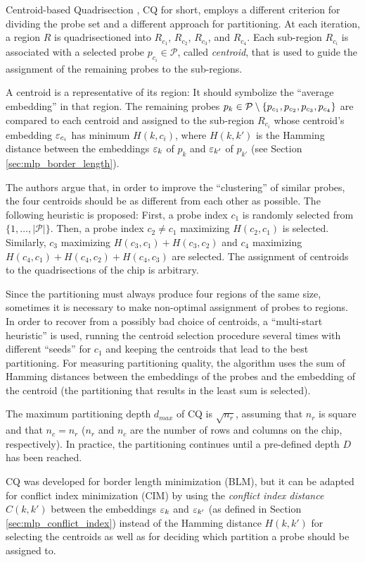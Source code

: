 Centroid-based Quadrisection \citep{Kahng2003a}, CQ for short, employs a
different criterion for dividing the probe set and a different approach for
partitioning. At each iteration, a region $R$ is quadrisectioned into $R_{c_1}$,
$R_{c_2}$, $R_{c_3}$, and $R_{c_4}$. Each sub-region $R_{c_i}$ is associated
with a selected probe $p_{c_i}\in \mathcal{P}$, called \emph{centroid}, that is
used to guide the assignment of the remaining probes to the sub-regions.

A centroid is a representative of its region: It should symbolize the ``average
embedding'' in that region. The remaining probes
$p_k \in {\mathcal{P}} \setminus \{p_{c_1},p_{c_2},p_{c_3},p_{c_4}\}$ are compared to
each centroid and assigned to the sub-region $R_{c_i}$ whose centroid's
embedding $\varepsilon_{c_i}$ has minimum $H(k,c_i)$, where $H(k,k')$ is the Hamming
distance between the embeddings $\varepsilon_k$ of $p_k$ and $\varepsilon_{k'}$ of $p_{k'}$
(see Section \ref{sec:mlp_border_length}).

The authors argue that, in order to improve the ``clustering'' of similar
probes, the four centroids should be as different from each other as possible.
The following heuristic is proposed: First, a probe index $c_1$ is randomly
selected from $\{1,\dots,|\mathcal{P}|\}$.  Then, a probe index $c_2\neq c_1$
maximizing $H(c_2,c_1)$ is selected.  Similarly, $c_3$ maximizing
$H(c_3,c_1) + H(c_3,c_2)$ and $c_4$ maximizing
$H(c_4,c_1) + H(c_4,c_2) + H(c_4,c_3)$ are selected.  The assignment of
centroids to the quadrisections of the chip is arbitrary.

Since the partitioning must always produce four regions of the same size,
sometimes it is necessary to make non-optimal assignment of probes to regions.
In order to recover from a possibly bad choice of centroids, a ``multi-start
heuristic'' is used, running the centroid selection procedure several times with
different ``seeds'' for $c_1$ and keeping the centroids that lead to the best
partitioning. For measuring partitioning quality, the algorithm uses the sum of
Hamming distances between the embeddings of the probes and the embedding of the
centroid (the partitioning that results in the least sum is selected).

The maximum partitioning depth $d_{max}$ of CQ is $\sqrt{n_r}$, assuming that
$n_r$ is square and that $n_c=n_r$ ($n_r$ and $n_c$ are the number of rows and
columns on the chip, respectively). In practice, the partitioning continues
until a pre-defined depth $D$ has been reached.

CQ was developed for border length minimization (BLM), but it can be adapted for
conflict index minimization (CIM) by using the \emph{conflict index distance}
$C(k,k')$ between the embeddings $\varepsilon_k$ and $\varepsilon_{k'}$ (as defined in Section
\ref{sec:mlp_conflict_index}) instead of the Hamming distance $H(k,k')$ for
selecting the centroids as well as for deciding which partition a probe should
be assigned to.

